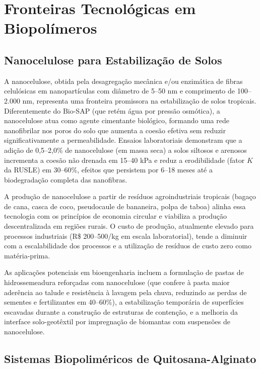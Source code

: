 \documentclass[
  portuguese,
  11pt,
  a4paper,
  open=any]{scrbook}
\begin{document}
\section{Fronteiras Tecnológicas em
Biopolímeros}\label{fronteiras-tecnoluxf3gicas-em-biopoluxedmeros}

\subsection{Nanocelulose para Estabilização de
Solos}\label{nanocelulose-para-estabilizauxe7uxe3o-de-solos}

A nanocelulose, obtida pela desagregação mecânica e/ou enzimática de
fibras celulósicas em nanopartículas com diâmetro de 5--50 nm e
comprimento de 100--2.000 nm, representa uma fronteira promissora na
estabilização de solos tropicais. Diferentemente do Bio-SAP (que retém
água por pressão osmótica), a nanocelulose atua como agente cimentante
biológico, formando uma rede nanofibrilar nos poros do solo que aumenta
a coesão efetiva sem reduzir significativamente a permeabilidade.
Ensaios laboratoriais demonstram que a adição de 0,5--2,0\% de
nanocelulose (em massa seca) a solos siltosos e arenosos incrementa a
coesão não drenada em 15--40 kPa e reduz a erodibilidade (fator \(K\) da
RUSLE) em 30--60\%, efeitos que persistem por 6--18 meses até a
biodegradação completa das nanofibras.

A produção de nanocelulose a partir de resíduos agroindustriais
tropicais (bagaço de cana, casca de coco, pseudocaule de bananeira,
polpa de taboa) alinha essa tecnologia com os princípios de economia
circular e viabiliza a produção descentralizada em regiões rurais. O
custo de produção, atualmente elevado para processos industriais (R\$
200--500/kg em escala laboratorial), tende a diminuir com a
escalabilidade dos processos e a utilização de resíduos de custo zero
como matéria-prima.

As aplicações potenciais em bioengenharia incluem a formulação de pastas
de hidrossemeadura reforçadas com nanocelulose (que confere à pasta
maior aderência ao talude e resistência à lavagem pela chuva, reduzindo
as perdas de sementes e fertilizantes em 40--60\%), a estabilização
temporária de superfícies escavadas durante a construção de estruturas
de contenção, e a melhoria da interface solo-geotêxtil por impregnação
de biomantas com suspensões de nanocelulose.

\subsection{Sistemas Biopoliméricos de
Quitosana-Alginato}\label{sistemas-biopolimuxe9ricos-de-quitosana-alginato}
\end{document}
